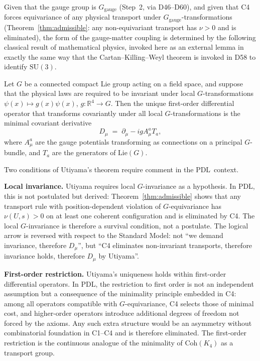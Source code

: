 \documentclass[11pt,a4paper]{article}
\newenvironment{lemmabox}[1][]{%
  \begin{tcolorbox}[lemmastyle,title={Lemma%
    \ifx\relax#1\relax\else: #1\fi}]}{\end{tcolorbox}}
\theoremstyle{plain}
\theoremstyle{definition}
\theoremstyle{remark}
\newcommand{\PDL}{\textsc{PDL}}
\newcommand{\SUthree}{\mathrm{SU}(3)}
\newcommand{\Ggauge}{G_{\mathrm{gauge}}}
\newcommand{\Coh}{\mathrm{Coh}(K_4)}
\newcommand{\Dmu}{D_\mu}
\begin{document}
Given that the gauge group is $\Ggauge$ (Step~2, via D46--D60), and given that C4
forces equivariance of any physical transport under $\Ggauge$-transformations
(Theorem~\ref{thm:admissible}: any non-equivariant transport has $\nu > 0$ and is
eliminated), the form of the gauge-matter coupling is determined by the following
classical result of mathematical physics, invoked here as an external lemma in
exactly the same way that the Cartan--Killing--Weyl theorem is invoked in D58 to
identify $\SUthree$.

\begin{lemmabox}[Utiyama, 1956~\cite{Utiyama1956}]
\label{lem:Utiyama}
Let $G$ be a connected compact Lie group acting on a field space, and suppose that
the physical laws are required to be invariant under local $G$-transformations
$\psi(x) \mapsto g(x)\psi(x)$, $g : \mathbb{R}^4 \to G$. Then the unique
first-order differential operator that transforms covariantly under all local
$G$-transformations is the minimal covariant derivative
\begin{equation}
\Dmu \;=\; \partial_\mu - ig A_\mu^a T_a,
\label{eq:Dmu}
\end{equation}
where $A_\mu^a$ are the gauge potentials transforming as connections on a principal
$G$-bundle, and $T_a$ are the generators of $\mathrm{Lie}(G)$.
\end{lemmabox}

Two conditions of Utiyama's theorem require comment in the \PDL\ context.

\textbf{Local invariance.} Utiyama requires local $G$-invariance as a hypothesis.
In \PDL, this is not postulated but derived: Theorem~\ref{thm:admissible} shows
that any transport rule with position-dependent violation of $G$-equivariance has
$\nu(U, s) > 0$ on at least one coherent configuration and is eliminated by C4.
The local $G$-invariance is therefore a survival condition, not a postulate. The
logical arrow is reversed with respect to the Standard Model: not ``we demand
invariance, therefore $\Dmu$'', but ``C4 eliminates non-invariant transports,
therefore invariance holds, therefore $\Dmu$ by Utiyama''.

\textbf{First-order restriction.} Utiyama's uniqueness holds within first-order
differential operators. In \PDL, the restriction to first order is not an
independent assumption but a consequence of the minimality principle embedded in
C4: among all operators compatible with $G$-equivariance, C4 selects those
of minimal cost, and higher-order operators introduce additional degrees of freedom
not forced by the axioms. Any such extra structure would be an asymmetry without
combinatorial foundation in C1--C4 and is therefore eliminated. The first-order
restriction is the continuous analogue of the minimality of $\Coh$ as a transport
group.
\end{document}
